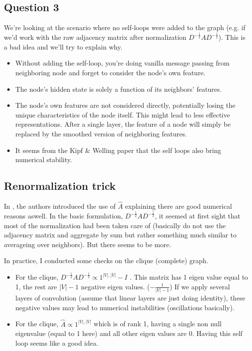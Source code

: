 \documentclass[a4paper]{article}
\begin{document}
\subsection*{Question 3}


We're looking at the scenario where no self-loops were added to the graph (e.g. if we'd work with the raw adjacency matrix after normalization
$D^{-\frac{1}{2}} A D^{-\frac{1}{2}}$). This is a bad idea and we'll try to explain why.
\begin{itemize}
    \item Without adding the self-loop, you're doing vanilla message passing from neighboring node and forget to consider the node's own feature.
    \item The node's hidden state is solely a function of its neighbors' features.
    \item The node's own features are not considered directly, potentially losing the unique characteristics of the node itself. 
    This might lead to less effective representations.  After a single layer, the feature of a node will simply 
    be replaced by the smoothed version of neighboring features.
    \item It seems from the Kipf \& Welling paper \cite{kipf2017semisupervised} that the self loops also bring numerical stability.
\end{itemize}
\subsection*{Renormalization trick}
In \cite{kipf2017semisupervised}, the authors introduced the use of $\hat{A}$ explaining there are good numerical 
reasons aswell. In the basic formulation, $D^{-\frac{1}{2}} A D^{-\frac{1}{2}}$, it seemed at first sight that most of the normalization had been taken
care of (basically do not use the adjacency matrix and aggregate by sum but rather something much similar to averageing over neighbors). But there seems to be more.

In practice, I conducted some checks on the clique (complete) graph.
\begin{itemize}
    \item For the clique, $D^{-\frac{1}{2}} A D^{-\frac{1}{2}} \propto 1^{|V|, |V|} - I$ . 
        \subitem This matrix has 1 eigen value equal to 1, the rest are $|V|-1$ negative eigen values. ($-\frac{1}{|V|-1}$)
        \subitem If we apply several layers of convolution (assume that linear layers are just doing identity), these negative values may lead 
        to numerical instabilities (oscillations basically).
    \item For the clique, $\hat{A} \propto 1^{|V|, |V|}$ which is of rank 1, having a single non null eigenvalue (equal to 1 here) and all other eigen values are 0. Having this self loop seems like a good idea.
\end{itemize}
\end{document}
